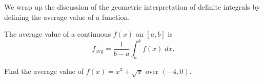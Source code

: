 \documentclass[../main.tex]{subfiles}
\begin{document}
  We wrap up the discussion of the geometric interpretation of definite integrals by defining the average value of a function. 

  The average value of a continuous \(f(x)\) on \([a,b]\) is
  \[
    f_{\text{avg}} = \frac{1}{b-a} \int_{a}^{b} f(x) \;dx.
  \]

  \begin{example}
    Find the average value of \(f(x) = x^{3} + \sqrt{x}\) over \((-4,0)\).

  \end{example}
\end{document}

